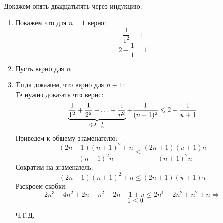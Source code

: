 \documentclass{report}
\begin{document}
\sol
Докажем опять \sout{двадцатьпять} через индукцию:\\
\begin{enumerate}
	\item Покажем что для $n=1$ верно: \\ 
		\begin{equation*}
			\dfrac{1}{1^2}=1
		\end{equation*}
		\begin{equation*}
			2-\dfrac{1}{1}=1
		\end{equation*}
	\item Пусть верно для $n$ \\
	\item Тогда докажем, что верно для $n+1$:\\
		Те нужно доказать что верно:
		\begin{equation*}
			\underbrace{\dfrac{1}{1^2}+\dfrac{1}{2^2}+\mathellipsis+\dfrac{1}{n^2}}_{\leqslant 2-\frac{1}{n}}+\dfrac{1}{(n+1)^2} \leqslant 2-\dfrac{1}{n+1}
		\end{equation*}
		Приведем к общему знаменателю:
		\begin{equation*}
			\dfrac{(2n-1)(n+1)^2+n}{(n+1)^2n} \leqslant \dfrac{(2n+1)(n+1)n}{(n+1)^2n}
		\end{equation*}
		Сократим на знаменатель:
		\begin{equation*}
			(2n-1)(n+1)^2+n\leqslant (2n+1)(n+1)n
		\end{equation*}
		Раскроем скобки:
		\begin{equation*}
			2n^3+4n^2+2n-n^2-2n-1+n\leqslant 2n^3+2n^2+n^2+n \Rightarrow
		\end{equation*}
		\begin{equation*}
			-1\leqslant 0
		\end{equation*}
		\begin{center}
			Ч.Т.Д.
		\end{center}

\end{enumerate}
\end{document}
